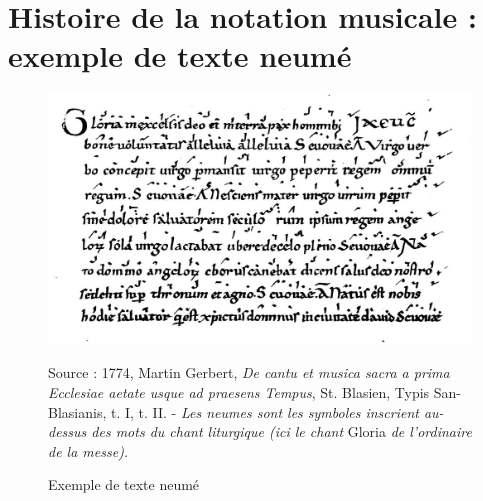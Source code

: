 
\section{Histoire de la notation musicale : exemple de texte neumé}
\label{sec:exempleTexteNeume}
\begin{figure}[!htbp]
	\centering
	\includegraphics[keepaspectratio=true, width=\textwidth]{Annexes/i/neumes.jpg}
	\caption{Exemple de texte neumé  }
	\medskip
	\small	
	Source : 1774, Martin Gerbert, \textit{De cantu et musica sacra a prima Ecclesiae aetate usque ad praesens Tempus}, St. Blasien, Typis San-Blasianis, t. I, t. II. - \textit{Les neumes sont les symboles inscrient au-dessus des mots du chant liturgique (ici le chant} Gloria \textit{de l'ordinaire de la messe).}
	\label{fig:neumes}
\end{figure}
\clearpage

